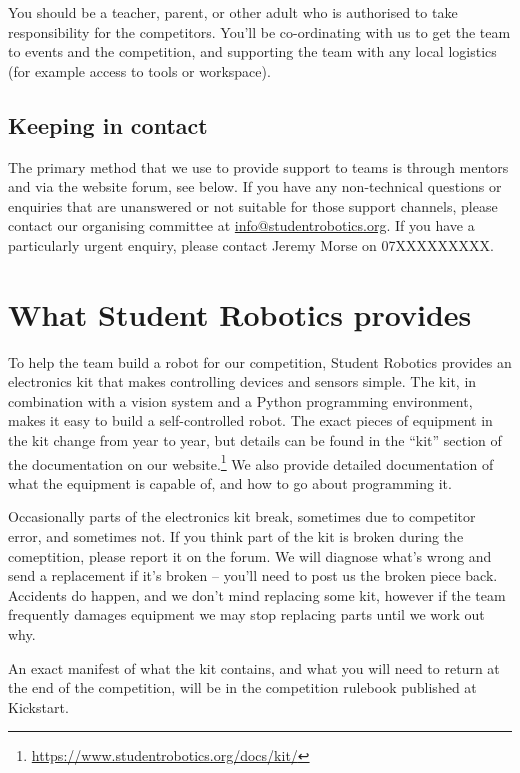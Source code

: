 \documentclass[a4paper]{article}
\begin{document}
You should be a teacher, parent, or other adult who is authorised to take
responsibility for the competitors. You'll be co-ordinating with us to get the
team to events and the competition, and supporting the team with any local
logistics (for example access to tools or workspace).

\subsection*{Keeping in contact}

The primary method that we use to provide support to teams is through mentors
and via the website forum, see below. If you have any non-technical questions
or enquiries that are unanswered or not suitable for those support channels,
please contact our organising committee at \url{info@studentrobotics.org}. If
you have a particularly urgent enquiry, please contact Jeremy Morse on
07XXXXXXXXX.

\section*{What Student Robotics provides}

To help the team build a robot for our competition, Student Robotics provides
an electronics kit that makes controlling devices and sensors simple. The kit,
in combination with a vision system and a Python programming environment,
makes it easy to build a self-controlled robot. The exact pieces of equipment
in the kit change from year to year, but details can be found in the ``kit''
section of the documentation on our
website.\footnote{\url{https://www.studentrobotics.org/docs/kit/}}
We also provide detailed documentation of what the equipment is capable of,
and how to go about programming it.

Occasionally parts of the electronics kit break, sometimes due to competitor
error, and sometimes not. If you think part of the kit is broken during the
comeptition, please report it on the forum. We will diagnose what's wrong and
send a replacement if it's broken -- you'll need to post us the broken piece
back. Accidents do happen, and we don't mind replacing some kit, however if
the team frequently damages equipment we may stop replacing parts until we
work out why.

An exact manifest of what the kit contains, and what you will need to return
at the end of the competition, will be in the competition rulebook published
at Kickstart.
\end{document}
